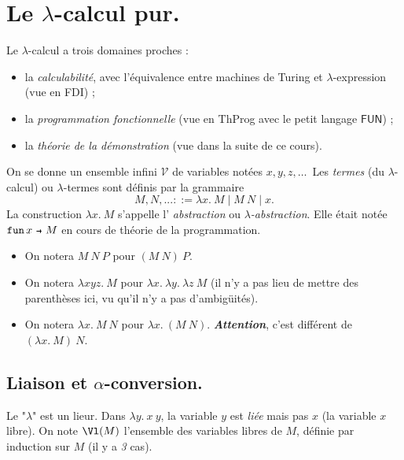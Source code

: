 \documentclass[./main]{subfiles}
\begin{document}
  \chapter{Le $\lambda$-calcul pur.}

  Le $\lambda$-calcul a trois domaines proches :
  \begin{itemize}
    \item la \textit{calculabilité}, avec l'équivalence entre machines de Turing et $\lambda$-expression (vue en FDI) ;
    \item la \textit{programmation fonctionnelle} (vue en ThProg avec le petit langage $\mathsf{FUN}$) ;
    \item la \textit{théorie de la démonstration} (vue dans la suite de ce cours).
  \end{itemize}

  On se donne un ensemble infini $\mathcal{V}$ de variables notées $x, y, z,\ldots$\
  Les \textit{termes} (du $\lambda$-calcul) ou $\lambda$-termes sont définis par la grammaire \[
  M, N, ... ::= \lambda x.\: M  \mid M \: N  \mid x
  .\]
  La construction $\lambda x.\: M$ s'appelle l' \textit{abstraction} ou  \textit{$\lambda$-abstraction}.
  Elle était notée $\fun x M$ en cours de théorie de la programmation.

  \begin{nota}
    \begin{itemize}
      \item On notera $M \: N \: P$ pour  $(M \: N) \: P$.
      \item On notera  $\lambda x y z. \: M$ pour  $\lambda x. \: \lambda y. \: \lambda z \: M$ (il n'y a pas lieu de mettre des parenthèses ici, vu qu'il n'y a pas d'ambigüités).
      \item On notera  $\lambda x. \: M \: N$ pour  $\lambda x. \: (M \: N)$.  \textit{\textbf{Attention}}, c'est différent de $(\lambda x.\: M) \: N$.
    \end{itemize}
  \end{nota}

  \section{Liaison et $\alpha$-conversion.}

  \begin{rmk}[Liaison]
    Le "$\lambda$" est un lieur.
    Dans $\lambda y. \: x \: y$, la variable  $y$ est \textit{liée} mais pas $x$ (la variable $x$ libre).
    On note $\Vl(M)$ l'ensemble des variables libres de  $M$, définie par induction sur $M$ (il y a \textit{3} cas).
  \end{rmk}
\end{document}
